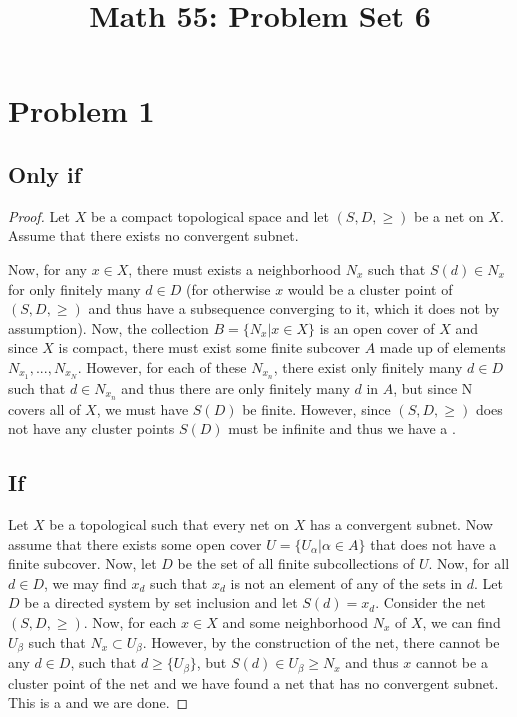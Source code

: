 \title{Math 55: Problem Set 6}

\maketitle
\section*{Problem 1}
\subsection*{Only if}
\begin{proof}
Let $X$ be a compact topological space and let $(S,D,\geq)$ be a net on $X$. Assume that there exists no convergent subnet. \par 
Now, for any $x\in X$, there must exists a neighborhood $N_x$ such that $S(d)\in N_x$ for only finitely many $d\in D$ (for otherwise $x$ would be a cluster point of $(S,D,\geq)$ and thus have a subsequence converging to it, which it does not by assumption). 
Now, the collection $B=\{N_x | x\in X\}$ is an open cover of $X$ and since $X$ is compact, there must exist some finite subcover $A$ made up of elements $N_{x_1}, ..., N_{x_N}$. 
However, for each of these $N_{x_n}$, there exist only finitely many $d\in D$ such that $d\in N_{x_n}$ and thus there are only finitely many $d$ in $A$, but since N covers all of $X$, we must have $S(D)$ be finite. However, since $(S,D,\geq)$ does not have any cluster points $S(D)$ must be infinite and thus we have a .
\subsection*{If}
Let $X$ be a topological such that every net on $X$ has a convergent subnet. Now assume that there exists some open cover $U=\{U_\alpha | \alpha\in A\}$ that does not have a finite subcover. Now, let $D$ be the set of all finite subcollections of $U$. Now, for all $d\in D$, we may find $x_d$ such that $x_d$ is not an element of any of the sets in $d$. Let $D$ be a directed system by set inclusion and let $S(d) = x_d$. Consider the net $(S,D,\geq)$. Now, for each $x\in X$ and some neighborhood $N_x$ of $X$, we can find $U_\beta$ such that $N_x \subset U_\beta$. However, by the construction of the net, there cannot be any $d\in D$, such that $d\geq \{U_\beta\}$, but $S(d)\in U_\beta \geq N_x$ and thus $x$ cannot be a cluster point of the net and we have found a net that has no convergent subnet. This is a  and we are done. 
\end{proof}
